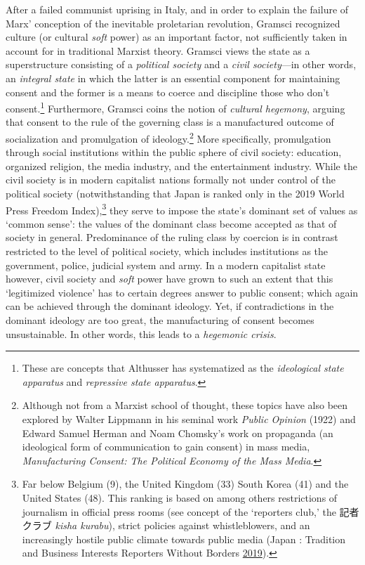 \documentclass[10pt,british,A4paper,,openany]{memoir}
\begin{document}
After a failed communist uprising in Italy, and in order to explain the
failure of Marx' conception of the inevitable proletarian revolution,
Gramsci recognized culture (or cultural \emph{soft} power) as an
important factor, not sufficiently taken in account for in traditional
Marxist theory. Gramsci views the state as a superstructure consisting
of a \emph{political society} and a \emph{civil society}---in other
words, an \emph{integral state} in which the latter is an essential
component for maintaining consent and the former is a means to coerce
and discipline those who don't consent.\footnote{These are concepts that
  Althusser has systematized as the \emph{ideological state apparatus}
  and \emph{repressive state apparatus}.} Furthermore, Gramsci coins the
notion of \emph{cultural hegemony}, arguing that consent to the rule of
the governing class is a manufactured outcome of socialization and
promulgation of ideology.\footnote{Although not from a Marxist school of
  thought, these topics have also been explored by Walter Lippmann in
  his seminal work \emph{Public Opinion} (1922) and Edward Samuel Herman
  and Noam Chomsky's work on propaganda (an ideological form of
  communication to gain consent) in mass media, \emph{Manufacturing
  Consent: The Political Economy of the Mass Media}.} More specifically,
promulgation through social institutions within the public sphere of
civil society: education, organized religion, the media industry, and
the entertainment industry. While the civil society is in modern
capitalist nations formally not under control of the political society
(notwithstanding that Japan is ranked only  in the 2019 World
Press Freedom Index),\footnote{Far below Belgium (9), the United Kingdom
  (33) South Korea (41) and the United States (48). This ranking is
  based on among others restrictions of journalism in official press
  rooms (see concept of the `reporters club,' the 記者クラブ \emph{kisha
  kurabu}), strict policies against whistleblowers, and an increasingly
  hostile public climate towards public media (Japan : Tradition and
  Business Interests Reporters Without Borders
  \protect\hyperlink{ref-noauthor_japan_2019}{2019}).} they serve to
impose the state's dominant set of values as `common sense': the values
of the dominant class become accepted as that of society in general.
Predominance of the ruling class by coercion is in contrast restricted
to the level of political society, which includes institutions as the
government, police, judicial system and army. In a modern capitalist
state however, civil society and \emph{soft} power have grown to such an
extent that this `legitimized violence' has to certain degrees answer to
public consent; which again can be achieved through the dominant
ideology. Yet, if contradictions in the dominant ideology are too great,
the manufacturing of consent becomes unsustainable. In other words, this
leads to a \emph{hegemonic crisis}.
\end{document}
